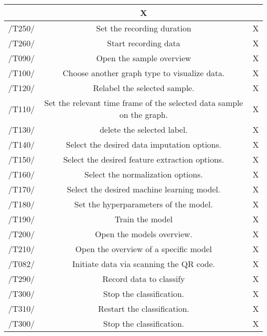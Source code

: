 \begin{table}[h]
\begin{tabular}{!{\VRule}c!{\VRule}c!{\VRule}c!{\VRule}}
 &   X  \\
 \hline
 /T250/   &  Set the recording duration &   X  \\
 \hline
 /T260/   &   Start recording data &   X  \\
 \hline
  /T090/   &  Open the sample overview  &   X  \\
 \hline
 /T100/    &  Choose another graph type to visualize data.  &   X \\
 \hline
 /T120/  &  Relabel the selected sample. &  X   \\
 \hline
 /T110/ & Set the relevant time frame of the selected data sample on the graph.  &   X  \\
 \hline
 /T130/  &  delete the selected label. &   X \\
 \hline
 /T140/  &Select the desired data imputation options. &   X \\
 \hline
 /T150/  & Select the desired feature extraction options.    &   X  \\
 \hline
 /T160/   &  Select the normalization options.
 &   X  \\
 \hline
 /T170/ &  Select the desired machine learning model.
 &   X  \\
 \hline
 /T180/ &  Set the hyperparameters of the model. &   X  \\
 \hline
  /T190/  &   Train the model  &   X  \\
 \hline
   /T200/    &  Open the models overview.  &   X  \\
 \hline
 /T210/     &  Open the overview of a specific model  &   X  \\
 \hline
 /T082/ &  Initiate data via scanning the QR code. &  X  \\
 \hline
 /T290/  & Record data to classify  &   X \\
 \hline
  /T300/   &  Stop the classification. &   X  \\
 \hline
 /T310/   &Restart the classification. &   X \\
 \hline
 /T300/   &  Stop the classification. &   X \\
 \hline
\end{tabular}
\end{table}
\clearpage
